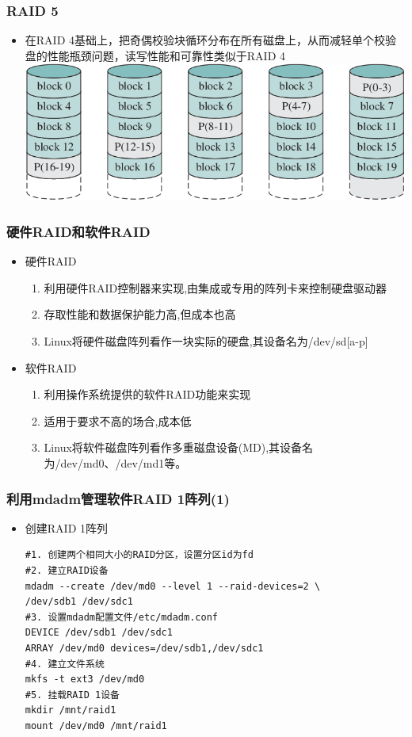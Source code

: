 \documentclass[xcolor=svgnames,presentation]{beamer}
\begin{document}
\begin{frame}
\frametitle{RAID 5}
\label{sec-4-7}
\begin{itemize}

\item 在RAID 4基础上，把奇偶校验块循环分布在所有磁盘上，从而减轻单个校验盘的性能瓶颈问题，读写性能和可靠性类似于RAID 4\\
\label{sec-4-7-1}%
\includegraphics[width=.9\linewidth]{img/raid5.png}
\end{itemize} %
\end{frame}
\begin{frame}
\frametitle{硬件RAID和软件RAID}
\label{sec-4-8}
\begin{itemize}

\item 硬件RAID
\label{sec-4-8-1}%
\begin{enumerate}
\item 利用硬件RAID控制器来实现,由集成或专用的阵列卡来控制硬盘驱动器
\item 存取性能和数据保护能力高,但成本也高
\item Linux将硬件磁盘阵列看作一块实际的硬盘,其设备名为/dev/sd[a-p]
\end{enumerate}

\item 软件RAID
\label{sec-4-8-2}%
\begin{enumerate}
\item 利用操作系统提供的软件RAID功能来实现
\item 适用于要求不高的场合,成本低
\item Linux将软件磁盘阵列看作多重磁盘设备(MD),其设备名为/dev/md0、/dev/md1等。
\end{enumerate}
\end{itemize} %
\end{frame}
\begin{frame}[fragile]
\frametitle{利用mdadm管理软件RAID 1阵列(1)}
\label{sec-4-9}
\begin{itemize}

\item 创建RAID 1阵列\\
\label{sec-4-9-1}%
\begin{verbatim}
#1. 创建两个相同大小的RAID分区，设置分区id为fd
#2. 建立RAID设备
mdadm --create /dev/md0 --level 1 --raid-devices=2 \
/dev/sdb1 /dev/sdc1
#3. 设置mdadm配置文件/etc/mdadm.conf
DEVICE /dev/sdb1 /dev/sdc1
ARRAY /dev/md0 devices=/dev/sdb1,/dev/sdc1
#4. 建立文件系统
mkfs -t ext3 /dev/md0
#5. 挂载RAID 1设备
mkdir /mnt/raid1
mount /dev/md0 /mnt/raid1
\end{verbatim}
\end{itemize} %
\end{frame}
\end{document}
